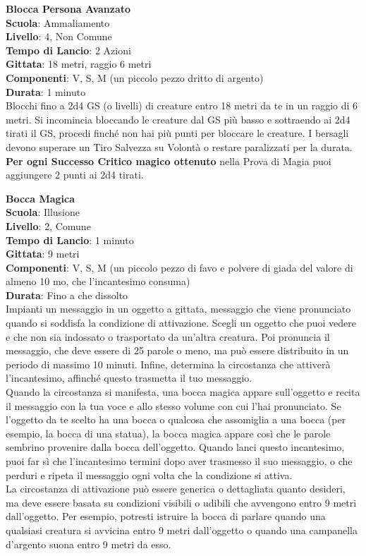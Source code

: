 \begin{multicols}{2}
\medskip\textbf{Blocca Persona Avanzato}\\
\textbf{Scuola}: Ammaliamento\\
\textbf{Livello}: 4, Non Comune\\
\textbf{Tempo di Lancio}: 2 Azioni\\
\textbf{Gittata}: 18 metri, raggio 6 metri\\
\textbf{Componenti}: V, S, M (un piccolo pezzo dritto di argento)\\
\textbf{Durata}: 1 minuto\\
Blocchi fino a 2d4 GS (o livelli) di creature entro 18 metri da te in un raggio di 6 metri. Si incomincia bloccando le creature dal GS più basso e sottraendo ai 2d4 tirati il GS, procedi finché non hai più punti per bloccare le creature. I bersagli devono superare un Tiro Salvezza su Volontà o restare paralizzati per la durata.\\
\textbf{Per ogni Successo Critico magico ottenuto} nella Prova di Magia puoi aggiungere 2 punti ai 2d4 tirati.

\medskip\textbf{Bocca Magica}\\
\textbf{Scuola}: Illusione\\
\textbf{Livello}: 2, Comune\\
\textbf{Tempo di Lancio}: 1 minuto\\
\textbf{Gittata}: 9 metri\\
\textbf{Componenti}: V, S, M (un piccolo pezzo di favo e polvere di giada del valore di almeno 10 mo, che l'incantesimo consuma)\\
\textbf{Durata}: Fino a che dissolto\\
Impianti un messaggio in un oggetto a gittata, messaggio che viene pronunciato quando si soddisfa la condizione di attivazione. Scegli un oggetto che puoi vedere e che non sia indossato o trasportato da un'altra creatura. Poi pronuncia il messaggio, che deve essere di 25 parole o meno, ma può essere distribuito in un periodo di massimo 10 minuti. Infine, determina la circostanza che attiverà l'incantesimo, affinché questo trasmetta il tuo messaggio.\\
Quando la circostanza si manifesta, una bocca magica appare sull'oggetto e recita il messaggio con la tua voce e allo stesso volume con cui l'hai pronunciato. Se l'oggetto da te scelto ha una bocca o qualcosa che assomiglia a una bocca (per esempio, la bocca di una statua), la bocca magica appare così che le parole sembrino provenire dalla bocca dell'oggetto. Quando lanci questo incantesimo, puoi far sì che l'incantesimo termini dopo aver trasmesso il suo messaggio, o che perduri e ripeta il messaggio ogni volta che la condizione si attiva.\\
La circostanza di attivazione può essere generica o dettagliata quanto desideri, ma deve essere basata su condizioni visibili o udibili che avvengono entro 9 metri dall'oggetto. Per esempio, potresti istruire la bocca di parlare quando una qualsiasi creatura si avvicina entro 9 metri dall'oggetto o quando una campanella d'argento suona entro 9 metri da esso.


\end{multicols}
